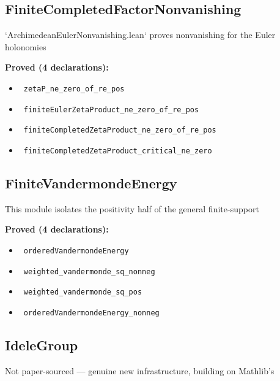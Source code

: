 \documentclass{report}
\theoremstyle{definition}
\begin{document}
\subsection{FiniteCompletedFactorNonvanishing}
`ArchimedeanEulerNonvanishing.lean` proves nonvanishing for the Euler holonomies

\noindent\textbf{Proved (4 declarations):}
\begin{itemize}
  \item {}\leanok\ \texttt{zetaP\_ne\_zero\_of\_re\_pos}
  \item {}\leanok\ \texttt{finiteEulerZetaProduct\_ne\_zero\_of\_re\_pos}
  \item {}\leanok\ \texttt{finiteCompletedZetaProduct\_ne\_zero\_of\_re\_pos}
  \item {}\leanok\ \texttt{finiteCompletedZetaProduct\_critical\_ne\_zero}
\end{itemize}

\subsection{FiniteVandermondeEnergy}
This module isolates the positivity half of the general finite-support

\noindent\textbf{Proved (4 declarations):}
\begin{itemize}
  \item {}\leanok\ \texttt{orderedVandermondeEnergy}
  \item {}\leanok\ \texttt{weighted\_vandermonde\_sq\_nonneg}
  \item {}\leanok\ \texttt{weighted\_vandermonde\_sq\_pos}
  \item {}\leanok\ \texttt{orderedVandermondeEnergy\_nonneg}
\end{itemize}

\subsection{IdeleGroup}
Not paper-sourced — genuine new infrastructure, building on Mathlib's
\end{document}
